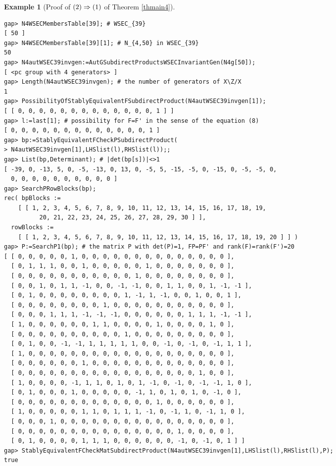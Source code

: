 \documentclass{amsart}
\theoremstyle{plain}
\theoremstyle{definition}
\newtheorem{example}[theorem]{Example}
\theoremstyle{remark}
\begin{document}
\begin{example}[Proof of ${\rm (2)}\Rightarrow {\rm (1)}$ of {Theorem \ref{thmain4}}]
\begin{verbatim}
gap> N4WSECMembersTable[39]; # WSEC_{39}
[ 50 ]
gap> N4WSECMembersTable[39][1]; # N_{4,50} in WSEC_{39}
50
gap> N4autWSEC39invgen:=AutGSubdirectProductsWSECInvariantGen(N4g[50]);
[ <pc group with 4 generators> ]
gap> Length(N4autWSEC39invgen); # the number of generators of X\Z/X
1
gap> PossibilityOfStablyEquivalentFSubdirectProduct(N4autWSEC39invgen[1]);
[ [ 0, 0, 0, 0, 0, 0, 0, 0, 0, 0, 0, 0, 0, 1 ] ]
gap> l:=last[1]; # possibility for F=F' in the sense of the equation (8)
[ 0, 0, 0, 0, 0, 0, 0, 0, 0, 0, 0, 0, 0, 1 ]
gap> bp:=StablyEquivalentFCheckPSubdirectProduct(
> N4autWSEC39invgen[1],LHSlist(l),RHSlist(l));;
gap> List(bp,Determinant); # |det(bp[s])|<>1
[ -39, 0, -13, 5, 0, -5, -13, 0, 13, 0, -5, 5, -15, -5, 0, -15, 0, -5, -5, 0, 
  0, 0, 0, 0, 0, 0, 0, 0, 0, 0 ]
gap> SearchPRowBlocks(bp);
rec( bpBlocks := 
    [ [ 1, 2, 3, 4, 5, 6, 7, 8, 9, 10, 11, 12, 13, 14, 15, 16, 17, 18, 19, 
          20, 21, 22, 23, 24, 25, 26, 27, 28, 29, 30 ] ], 
  rowBlocks := 
    [ [ 1, 2, 3, 4, 5, 6, 7, 8, 9, 10, 11, 12, 13, 14, 15, 16, 17, 18, 19, 20 ] ] )
gap> P:=SearchP1(bp); # the matrix P with det(P)=1, FP=PF' and rank(F)=rank(F')=20
[ [ 0, 0, 0, 0, 0, 1, 0, 0, 0, 0, 0, 0, 0, 0, 0, 0, 0, 0, 0, 0 ], 
  [ 0, 1, 1, 1, 0, 0, 1, 0, 0, 0, 0, 0, 1, 0, 0, 0, 0, 0, 0, 0 ], 
  [ 0, 0, 0, 0, 0, 0, 0, 0, 0, 0, 0, 1, 0, 0, 0, 0, 0, 0, 0, 0 ], 
  [ 0, 0, 1, 0, 1, 1, -1, 0, 0, -1, -1, 0, 0, 1, 1, 0, 0, 1, -1, -1 ], 
  [ 0, 1, 0, 0, 0, 0, 0, 0, 0, 0, 1, -1, 1, -1, 0, 0, 1, 0, 0, 1 ], 
  [ 0, 0, 0, 0, 0, 0, 0, 0, 1, 0, 0, 0, 0, 0, 0, 0, 0, 0, 0, 0 ], 
  [ 0, 0, 0, 1, 1, 1, -1, -1, -1, 0, 0, 0, 0, 0, 0, 1, 1, 1, -1, -1 ], 
  [ 1, 0, 0, 0, 0, 0, 0, 1, 1, 0, 0, 0, 0, 1, 0, 0, 0, 0, 1, 0 ], 
  [ 0, 0, 0, 0, 0, 0, 0, 0, 0, 0, 1, 0, 0, 0, 0, 0, 0, 0, 0, 0 ], 
  [ 0, 1, 0, 0, -1, -1, 1, 1, 1, 1, 1, 0, 0, -1, 0, -1, 0, -1, 1, 1 ], 
  [ 1, 0, 0, 0, 0, 0, 0, 0, 0, 0, 0, 0, 0, 0, 0, 0, 0, 0, 0, 0 ], 
  [ 0, 0, 0, 0, 0, 0, 1, 0, 0, 0, 0, 0, 0, 0, 0, 0, 0, 0, 0, 0 ], 
  [ 0, 0, 0, 0, 0, 0, 0, 0, 0, 0, 0, 0, 0, 0, 0, 0, 0, 1, 0, 0 ], 
  [ 1, 0, 0, 0, 0, -1, 1, 1, 0, 1, 0, 1, -1, 0, -1, 0, -1, -1, 1, 0 ], 
  [ 0, 1, 0, 0, 0, 1, 0, 0, 0, 0, 0, -1, 1, 0, 1, 0, 1, 0, -1, 0 ], 
  [ 0, 0, 0, 0, 0, 0, 0, 0, 0, 0, 0, 0, 0, 1, 0, 0, 0, 0, 0, 0 ], 
  [ 1, 0, 0, 0, 0, 0, 1, 1, 0, 1, 1, 1, -1, 0, -1, 1, 0, -1, 1, 0 ], 
  [ 0, 0, 0, 1, 0, 0, 0, 0, 0, 0, 0, 0, 0, 0, 0, 0, 0, 0, 0, 0 ], 
  [ 0, 0, 0, 0, 0, 0, 0, 0, 0, 0, 0, 0, 0, 0, 0, 1, 0, 0, 0, 0 ], 
  [ 0, 1, 0, 0, 0, 0, 1, 1, 1, 0, 0, 0, 0, 0, 0, -1, 0, -1, 0, 1 ] ]
gap> StablyEquivalentFCheckMatSubdirectProduct(N4autWSEC39invgen[1],LHSlist(l),RHSlist(l),P);
true


\end{verbatim}
\end{example}
\end{document}
